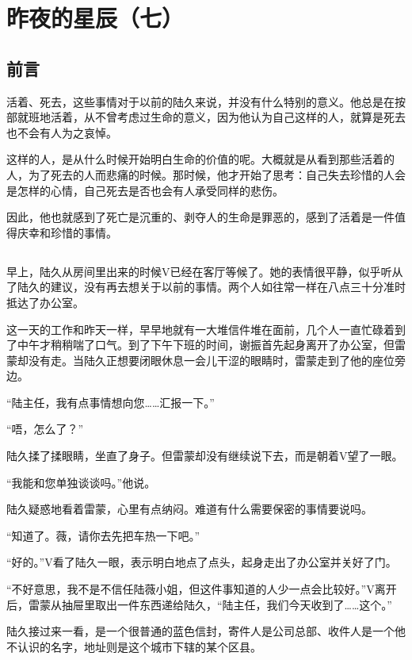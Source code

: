 \chapter{昨夜的星辰（七）}

\section*{前言}

活着、死去，这些事情对于以前的陆久来说，并没有什么特别的意义。他总是在按部就班地活着，从不曾考虑过生命的意义，因为他认为自己这样的人，就算是死去也不会有人为之哀悼。

这样的人，是从什么时候开始明白生命的价值的呢。大概就是从看到那些活着的人，为了死去的人而悲痛的时候。那时候，他才开始了思考：自己失去珍惜的人会是怎样的心情，自己死去是否也会有人承受同样的悲伤。

因此，他也就感到了死亡是沉重的、剥夺人的生命是罪恶的，感到了活着是一件值得庆幸和珍惜的事情。

\lineseparator
\section*{}

早上，陆久从房间里出来的时候V已经在客厅等候了。她的表情很平静，似乎听从了陆久的建议，没有再去想关于以前的事情。两个人如往常一样在八点三十分准时抵达了办公室。

这一天的工作和昨天一样，早早地就有一大堆信件堆在面前，几个人一直忙碌着到了中午才稍稍喘了口气。到了下午下班的时间，谢振首先起身离开了办公室，但雷蒙却没有走。当陆久正想要闭眼休息一会儿干涩的眼睛时，雷蒙走到了他的座位旁边。

“陆主任，我有点事情想向您……汇报一下。”

“唔，怎么了？”

陆久揉了揉眼睛，坐直了身子。但雷蒙却没有继续说下去，而是朝着V望了一眼。

“我能和您单独谈谈吗。”他说。

陆久疑惑地看着雷蒙，心里有点纳闷。难道有什么需要保密的事情要说吗。

“知道了。薇，请你去先把车热一下吧。”

“好的。”V看了陆久一眼，表示明白地点了点头，起身走出了办公室并关好了门。

“不好意思，我不是不信任陆薇小姐，但这件事知道的人少一点会比较好。”V离开后，雷蒙从抽屉里取出一件东西递给陆久，“陆主任，我们今天收到了……这个。”

陆久接过来一看，是一个很普通的蓝色信封，寄件人是公司总部、收件人是一个他不认识的名字，地址则是这个城市下辖的某个区县。


